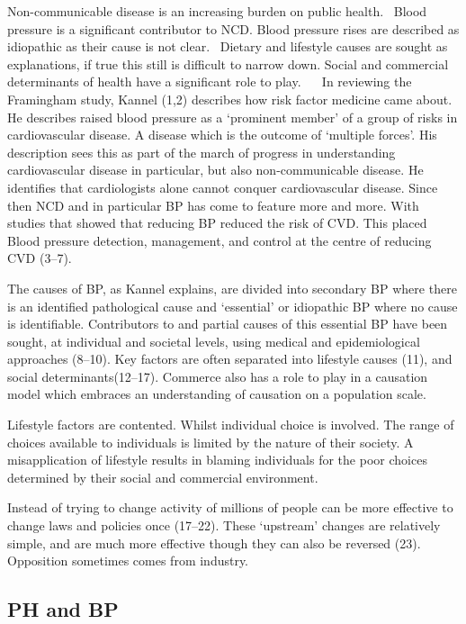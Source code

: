 \documentclass[
]{article}
\begin{document}
Non-communicable disease is an increasing burden on public health.~
Blood pressure is a significant contributor to NCD. Blood pressure rises
are described as idiopathic as their cause is not clear.~ Dietary and
lifestyle causes are sought as explanations, if true this still is
difficult to narrow down. Social and commercial determinants of health
have a significant role to play.~ ~ In reviewing the Framingham study,
Kannel (1,2) describes how risk factor medicine came about. He describes
raised blood pressure as a `prominent member' of a group of risks in
cardiovascular disease. A disease which is the outcome of `multiple
forces'. His description sees this as part of the march of progress in
understanding cardiovascular disease in particular, but also
non-communicable disease. He identifies that cardiologists alone cannot
conquer cardiovascular disease. Since then NCD and in particular BP has
come to feature more and more. With studies that showed that reducing BP
reduced the risk of CVD. This placed Blood pressure detection,
management, and control at the centre of reducing CVD (3--7).

The causes of BP, as Kannel explains, are divided into secondary BP
where there is an identified pathological cause and `essential' or
idiopathic BP where no cause is identifiable. Contributors to and
partial causes of this essential BP have been sought, at individual and
societal levels, using medical and epidemiological approaches (8--10).
Key factors are often separated into lifestyle causes (11), and social
determinants(12--17). Commerce also has a role to play in a causation
model which embraces an understanding of causation on a population
scale.

Lifestyle factors are contented. Whilst individual choice is involved.
The range of choices available to individuals is limited by the nature
of their society. A misapplication of lifestyle results in blaming
individuals for the poor choices determined by their social and
commercial environment.

Instead of trying to change activity of millions of people can be more
effective to change laws and policies once (17--22). These `upstream'
changes are relatively simple, and are much more effective though they
can also be reversed (23). Opposition sometimes comes from industry.

\hypertarget{ph-and-bp}{%
\subsection{PH and BP}\label{ph-and-bp}}
\end{document}
